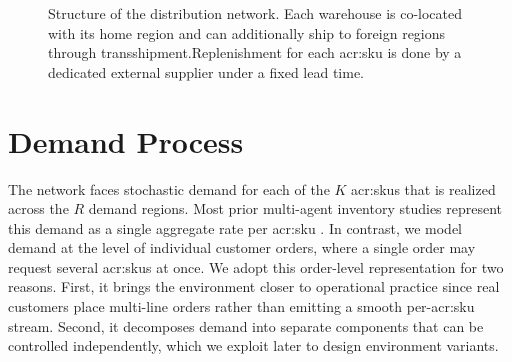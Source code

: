 \begin{figure}[H]
  \caption[Distribution network]{Structure of the distribution network. Each warehouse is co-located with
  its home region and can additionally ship to foreign regions through transshipment.Replenishment for each \gls{acr:sku} is done by a dedicated external supplier under a fixed lead time.}
  \label{fig:sc-network}
\end{figure}


\section{Demand Process}
\label{sec:demand-model}
The network faces stochastic demand for each of the $K$ \glspl{acr:sku} that is realized across the $R$ demand regions. Most prior multi-agent inventory studies represent this demand as a single aggregate rate per \gls{acr:sku} \citep{mousa2024analysis}. In contrast, we model demand at the level of individual customer orders, where a single order may request several \glspl{acr:sku} at once. We adopt this order-level representation for two reasons. First, it brings the environment closer to operational practice since real customers place multi-line orders rather than emitting a smooth per-\gls{acr:sku} stream. Second, it decomposes demand into separate components that can be controlled independently, which we exploit later to design environment variants.

